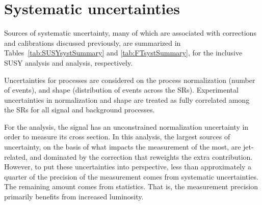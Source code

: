 \FloatBarrier

\section{Systematic uncertainties}

Sources of systematic uncertainty, many of which
are associated with corrections and calibrations discussed previously,
are summarized in Tables~\ref{tab:SUSYsystSummary} and \ref{tab:FTsystSummary},
for the inclusive SUSY analysis and \smft analysis, respectively.

Uncertainties for processes
are considered on the process normalization (number of events),
and shape (distribution of events across the SRs).
Experimental uncertainties in normalization and shape are treated as
fully correlated among the SRs for all signal and background processes.

For the \smft analysis, the \tttt signal has an unconstrained normalization uncertainty
in order to measure its cross section. In this analysis, the largest
sources of uncertainty, on the basis of what impacts the measurement of \tttt the most,
are jet-related, and dominated by the correction that reweights
the extra \cPqb contribution. However, to put these uncertainties into perspective,
less than approximately a quarter of the precision of the \tttt measurement
comes from systematic uncertainties. The remaining amount comes from statistics.
That is, the \smft measurement precision primarily benefits from increased luminosity.

